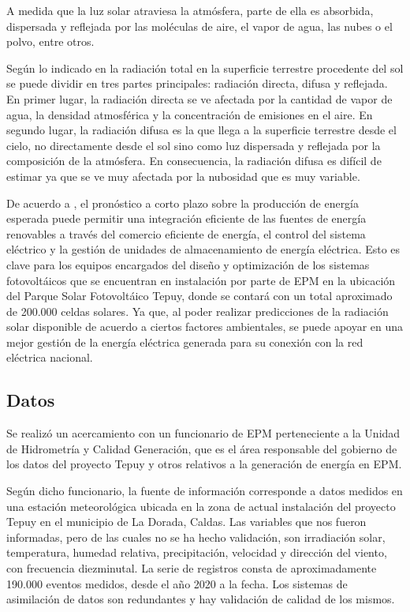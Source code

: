 \documentclass[a4paper]{article}
\begin{document}
A medida que la luz solar atraviesa la atmósfera, parte de ella es absorbida, dispersada y reflejada por las moléculas de aire, el vapor de agua, las nubes o el polvo, entre otros.

Según lo indicado en \cite{ref:estsolirr} la radiación total en la superficie terrestre procedente del sol se puede dividir en tres partes principales: radiación directa, difusa y reflejada. En primer lugar, la radiación directa se ve afectada por la cantidad de vapor de agua, la densidad atmosférica y la concentración de emisiones en el aire. En segundo lugar, la radiación difusa es la que llega a la superficie terrestre desde el cielo, no directamente desde el sol sino como luz dispersada y reflejada por la composición de la atmósfera. En consecuencia, la radiación difusa es difícil de estimar ya que se ve muy afectada por la nubosidad que es muy variable.

De acuerdo a \cite{ref:benefitsofshort}, el pronóstico a corto plazo sobre la producción de energía esperada puede permitir una integración eficiente de las fuentes de energía renovables a través del comercio eficiente de energía, el control del sistema eléctrico y la gestión de unidades de almacenamiento de energía eléctrica. Esto es clave para los equipos encargados del diseño y optimización de los sistemas fotovoltáicos que se encuentran en instalación por parte de EPM en la ubicación del Parque Solar Fotovoltáico Tepuy, donde se contará con un total aproximado de 200.000 celdas solares. Ya que, al poder realizar predicciones de la radiación solar disponible de acuerdo a ciertos factores ambientales, se puede apoyar en una mejor gestión de la energía eléctrica generada para su conexión con la red eléctrica nacional.

\subsection{Datos}

Se realizó un acercamiento con un funcionario de EPM perteneciente a la Unidad de Hidrometría y Calidad Generación, que es el área responsable del gobierno de los datos del proyecto Tepuy y otros relativos a la generación de energía en EPM.

Según dicho funcionario, la fuente de información corresponde a datos medidos en una estación meteorológica ubicada en la zona de actual instalación del proyecto Tepuy en el municipio de La Dorada, Caldas. Las variables que nos fueron informadas, pero de las cuales no se ha hecho validación, son irradiación solar, temperatura, humedad relativa, precipitación, velocidad y dirección del viento, con frecuencia diezminutal. La serie de registros consta de aproximadamente 190.000 eventos medidos, desde el año 2020 a la fecha. Los sistemas de asimilación de datos son redundantes y hay validación de calidad de los mismos.
\end{document}
